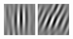 \begin{figure}
\begin{center}
  \includegraphics[width=\columnwidth/9]{ch4/figures/imag_3_0.jpg}
  \includegraphics[width=\columnwidth/9]{ch4/figures/imag_3_1.jpg}

\end{center}
\end{figure}
